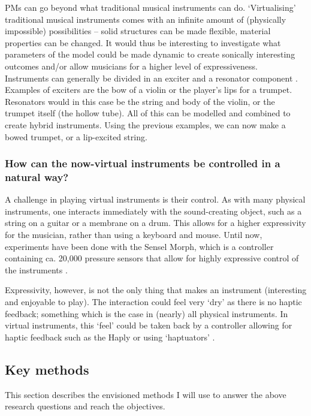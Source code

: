 \noindent PMs can go beyond what traditional musical instruments can do. ‘Virtualising’ traditional musical instruments comes with an infinite amount of (physically impossible) possibilities -- solid structures can be made flexible, material properties can be changed. It would thus be interesting to investigate what parameters of the model could be made dynamic to create sonically interesting outcomes and/or allow musicians for a higher level of expressiveness.
\\

\noindent Instruments can generally be divided in an exciter and a resonator component \cite{Borin1989}. Examples of exciters are the bow of a violin or the player's lips for a trumpet. Resonators would in this case be the string and body of the violin, or the trumpet itself (the hollow tube). All of this can be modelled and combined to create hybrid instruments. Using the previous examples, we can now make a bowed trumpet, or a lip-excited string.

\subsubsection*{How can the now-virtual instruments be controlled in a natural way?}
A challenge in playing virtual instruments is their control. As with many physical instruments, one interacts immediately with the sound-creating object, such as a string on a guitar or a membrane on a drum. This allows for a higher expressivity for the musician, rather than using a keyboard and mouse. Until now, experiments have been done with the Sensel Morph, which is a controller containing ca. 20,000 pressure sensors that allow for highly expressive control of the instruments \cite{Sensel2019}.

Expressivity, however, is not the only thing that makes an instrument (interesting and enjoyable to play). The interaction could feel very `dry' as there is no haptic feedback; something which is the case in (nearly) all physical instruments. In virtual instruments, this `feel' could be taken back by a controller allowing for haptic feedback such as the Haply \cite{Haply2019} or using `haptuators' \cite{tactile2019}.

\subsection{Key methods}
This section describes the envisioned methods I will use to answer the above research questions and reach the objectives.

